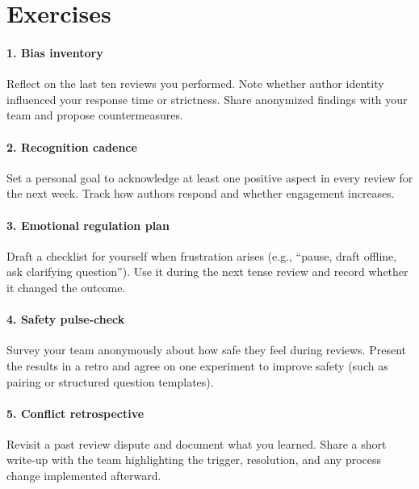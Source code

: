\section*{Exercises}

\paragraph{1. Bias inventory} Reflect on the last ten reviews you performed. Note whether author identity influenced your response time or strictness. Share anonymized findings with your team and propose countermeasures.

\paragraph{2. Recognition cadence} Set a personal goal to acknowledge at least one positive aspect in every review for the next week. Track how authors respond and whether engagement increases.

\paragraph{3. Emotional regulation plan} Draft a checklist for yourself when frustration arises (e.g., ``pause, draft offline, ask clarifying question''). Use it during the next tense review and record whether it changed the outcome.

\paragraph{4. Safety pulse-check} Survey your team anonymously about how safe they feel during reviews. Present the results in a retro and agree on one experiment to improve safety (such as pairing or structured question templates).

\paragraph{5. Conflict retrospective} Revisit a past review dispute and document what you learned. Share a short write-up with the team highlighting the trigger, resolution, and any process change implemented afterward.
